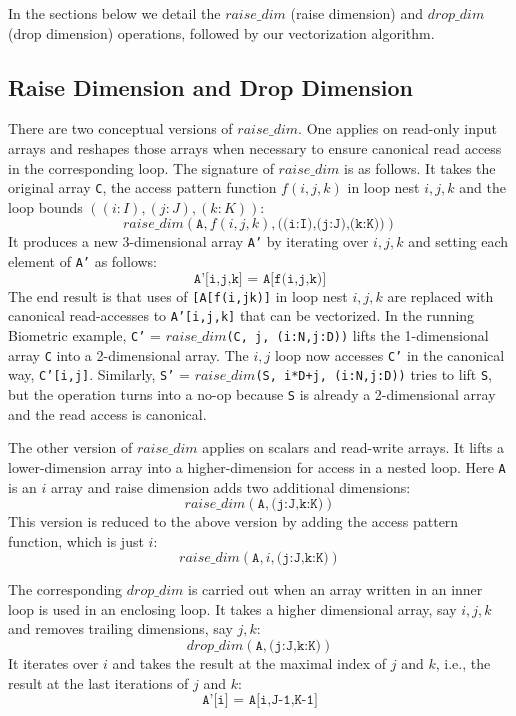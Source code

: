 In the sections below we detail the $\mathit{raise\_dim}$ (raise dimension) and $\mathit{drop\_dim}$ (drop dimension) operations,
followed by our vectorization algorithm.

\subsection{Raise Dimension and Drop Dimension}

There are two conceptual versions of $\mathit{raise\_dim}$. One applies on read-only input arrays and reshapes those arrays
when necessary to ensure canonical read access in the corresponding loop. The signature of $\mathit{raise\_dim}$
is as follows. It takes the original array \texttt{C}, the access pattern function $f(i,j,k)$ in loop nest $i,j,k$ and the loop bounds
$((i:I),(j:J),(k:K))$:
\[ \mathit{raise\_dim}(\texttt{A}, f(i,j,k), \texttt{((i:I),(j:J),(k:K))}) \]
It produces a new 3-dimensional array \texttt{A'} by iterating over $i,j,k$ and setting each element of  \texttt{A'} as follows:
\[ \texttt{A'[i,j,k] =  A[f(i,j,k)]} \]
The end result is that uses of \texttt{[A[f(i,jk)]} in loop nest $i,j,k$ are replaced with canonical read-accesses to \texttt{A'[i,j,k]}
that can be vectorized. In the running Biometric example, \texttt{C'} = $\mathit{raise\_dim}$\texttt{(C, j, (i:N,j:D))} lifts the
1-dimensional array \texttt{C} into a 2-dimensional array. The $i,j$ loop now accesses \texttt{C'} in the canonical way, \texttt{C'[i,j]}.
Similarly, \texttt{S'} = $\mathit{raise\_dim}$\texttt{(S, i*D+j, (i:N,j:D))} tries to lift \texttt{S}, but the operation turns into a no-op
because \texttt{S} is already a 2-dimensional array and the read access is canonical.

The other version of $\mathit{raise\_dim}$ applies on scalars and read-write arrays. It lifts a lower-dimension array into a
higher-dimension for access in a nested loop. Here \texttt{A} is an $i$ array and raise dimension adds two additional dimensions:
\[ \mathit{raise\_dim}(\texttt{A}, \texttt{(j:J,k:K)}) \]
This version is reduced to the above version by adding the access pattern function, which is just $i$:
\[ \mathit{raise\_dim}(\texttt{A}, i, \texttt{(j:J,k:K)}) \]

The corresponding $\mathit{drop\_dim}$ is carried out when an array written in an inner loop is used in an enclosing loop.
It takes a higher dimensional array, say $i,j,k$ and removes trailing dimensions, say $j,k$:
\[ \mathit{drop\_dim}(\texttt{A}, \texttt{(j:J,k:K)}) \]
It iterates over $i$ and takes the result at the maximal index of $j$ and $k$, i.e., the result at the last iterations of $j$ and $k$:
\[ \texttt{A'[i] = A[i,J-1,K-1]} \]


